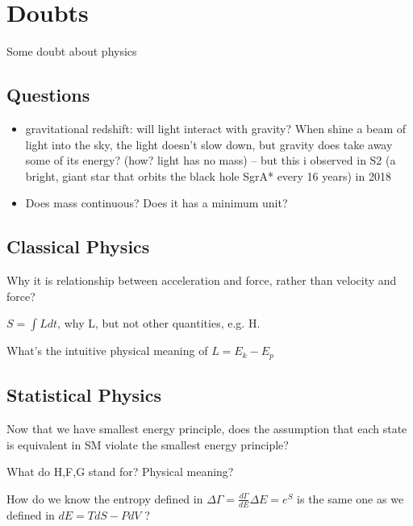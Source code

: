 \newcommand{\DOF}{degree of freedom}

\section{Doubts}
Some doubt about physics

\subsection{Questions}
\begin{itemize}
    \item gravitational redshift: will light interact with gravity? When shine 
	a beam of light into the sky, the light doesn't slow down, but gravity 
	does take away some of its energy? (how? light has no mass) -- but this 
	i observed in S2 (a bright, giant star that orbits the black hole 
	SgrA* every 16 years) in 2018
    \item Does mass continuous? Does it has a minimum unit?
\end{itemize}

\subsection{Classical Physics}
\begin{description}[style=nextline]
    \item [Newton's Second Law]	Why it is relationship between acceleration
	and force, rather than velocity and force?
    \item [Action] $S = \int Ldt$, why L, but not other quantities, e.g. H.
    \item [Lagrangian] What's the intuitive physical meaning of 
	$L = E_{k} - E_{p}$
\end{description}

\subsection{Statistical Physics}
\begin{description}[style=nextline]
    \item Now that we have smallest energy principle, does the assumption that
	each state is equivalent in SM violate the smallest energy principle?
    \item [Enthalpy, Free energy, Gibbs Free energy] What do H,F,G stand for? 
	Physical meaning?
    \item [Entropy] How do we know the entropy defined in $\Delta \Gamma =
	\frac{d\Gamma}{dE}\Delta E = e^{S}$ is the same one as we defined in
	$dE = TdS - PdV$ ?
\end{description}



